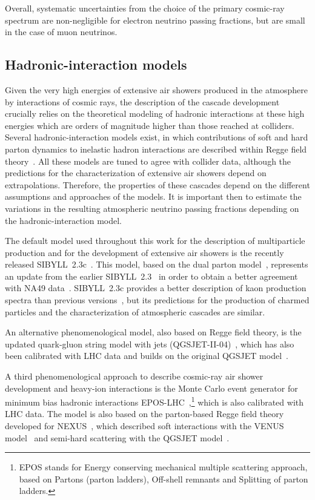 \documentclass[aps,prd,showpacs,letterpaper,onecolumn,longbibliography,superscriptaddress,notitlepage,nofootinbib]{revtex4-1}%
\begin{document}
Overall, systematic uncertainties from the choice of the primary cosmic-ray spectrum are non-negligible for electron neutrino passing fractions, but are small in the case of muon neutrinos.

\pagebreak 

\subsection{Hadronic-interaction models}
\label{sec:hadronic}

Given the very high energies of extensive air showers produced in the atmosphere by interactions of cosmic rays, the description of the cascade development crucially relies on the theoretical modeling of hadronic interactions at these high energies which are orders of magnitude higher than those reached at colliders. Several hadronic-interaction models exist, in which contributions of soft and hard parton dynamics to inelastic hadron interactions are described within Regge field theory~\cite{Gribov:1968fc}. All these models are tuned to agree with collider data, although the predictions for the characterization of extensive air showers depend on extrapolations. Therefore, the properties of these cascades depend on the different assumptions and approaches of the models. It is important then to estimate the variations in the resulting atmospheric neutrino passing fractions depending on the hadronic-interaction model.

The default model used throughout this work for the description of multiparticle production and for the development of extensive air showers is the recently released SIBYLL~2.3c~\cite{Riehn:2017mfm}. This model, based on the dual parton model~\cite{Capella:1977me, Capella:1981xr, Capella:1992yb}, represents an update from the earlier SIBYLL~2.3~\cite{Engel:2015dxa, Riehn:2015oba} in order to obtain a better agreement with NA49 data~\cite{Anticic:2010yg}. SIBYLL~2.3c provides a better description of kaon production spectra than previous versions~\cite{Ahn:2009wx, Engel:2015dxa, Riehn:2015oba}, but its predictions for the production of charmed particles and the characterization of atmospheric cascades are similar.

An alternative phenomenological model, also based on Regge field theory, is the updated quark-gluon string model with jets (QGSJET-II-04)~\cite{Ostapchenko:2010vb}, which has also been calibrated with LHC data and builds on the original QGSJET model~\cite{Kalmykov:1997te}.

A third phenomenological approach to describe cosmic-ray air shower development and heavy-ion interactions is the Monte Carlo event generator for minimum bias hadronic interactions EPOS-LHC~\cite{Werner:2005jf, Pierog:2013ria},\footnote{EPOS stands for Energy conserving mechanical multiple scattering approach, based on Partons (parton ladders), Off-shell remnants and Splitting of parton ladders.} which is also calibrated with LHC data. The model is also based on the parton-based Regge field theory developed for NEXUS~\cite{Drescher:2000ha}, which described soft interactions with the VENUS model~\cite{Werner:1993uh} and semi-hard scattering with the QGSJET model~\cite{Kalmykov:1997te}.
\end{document}
